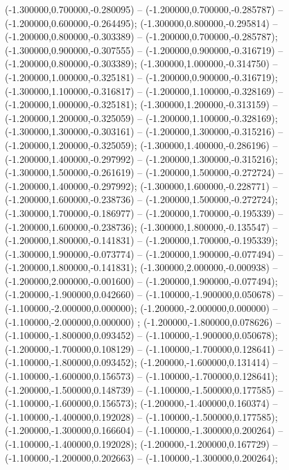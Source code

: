  (-1.300000,0.700000,-0.280095) -- (-1.200000,0.700000,-0.285787) -- (-1.200000,0.600000,-0.264495);
 (-1.300000,0.800000,-0.295814) -- (-1.200000,0.800000,-0.303389) -- (-1.200000,0.700000,-0.285787);
 (-1.300000,0.900000,-0.307555) -- (-1.200000,0.900000,-0.316719) -- (-1.200000,0.800000,-0.303389);
 (-1.300000,1.000000,-0.314750) -- (-1.200000,1.000000,-0.325181) -- (-1.200000,0.900000,-0.316719);
 (-1.300000,1.100000,-0.316817) -- (-1.200000,1.100000,-0.328169) -- (-1.200000,1.000000,-0.325181);
 (-1.300000,1.200000,-0.313159) -- (-1.200000,1.200000,-0.325059) -- (-1.200000,1.100000,-0.328169);
 (-1.300000,1.300000,-0.303161) -- (-1.200000,1.300000,-0.315216) -- (-1.200000,1.200000,-0.325059);
 (-1.300000,1.400000,-0.286196) -- (-1.200000,1.400000,-0.297992) -- (-1.200000,1.300000,-0.315216);
 (-1.300000,1.500000,-0.261619) -- (-1.200000,1.500000,-0.272724) -- (-1.200000,1.400000,-0.297992);
 (-1.300000,1.600000,-0.228771) -- (-1.200000,1.600000,-0.238736) -- (-1.200000,1.500000,-0.272724);
 (-1.300000,1.700000,-0.186977) -- (-1.200000,1.700000,-0.195339) -- (-1.200000,1.600000,-0.238736);
 (-1.300000,1.800000,-0.135547) -- (-1.200000,1.800000,-0.141831) -- (-1.200000,1.700000,-0.195339);
 (-1.300000,1.900000,-0.073774) -- (-1.200000,1.900000,-0.077494) -- (-1.200000,1.800000,-0.141831);
 (-1.300000,2.000000,-0.000938) -- (-1.200000,2.000000,-0.001600) -- (-1.200000,1.900000,-0.077494);
 (-1.200000,-1.900000,0.042660) -- (-1.100000,-1.900000,0.050678) -- (-1.100000,-2.000000,0.000000);
 (-1.200000,-2.000000,0.000000) -- (-1.100000,-2.000000,0.000000) ;
 (-1.200000,-1.800000,0.078626) -- (-1.100000,-1.800000,0.093452) -- (-1.100000,-1.900000,0.050678);
 (-1.200000,-1.700000,0.108129) -- (-1.100000,-1.700000,0.128641) -- (-1.100000,-1.800000,0.093452);
 (-1.200000,-1.600000,0.131414) -- (-1.100000,-1.600000,0.156573) -- (-1.100000,-1.700000,0.128641);
 (-1.200000,-1.500000,0.148739) -- (-1.100000,-1.500000,0.177585) -- (-1.100000,-1.600000,0.156573);
 (-1.200000,-1.400000,0.160374) -- (-1.100000,-1.400000,0.192028) -- (-1.100000,-1.500000,0.177585);
 (-1.200000,-1.300000,0.166604) -- (-1.100000,-1.300000,0.200264) -- (-1.100000,-1.400000,0.192028);
 (-1.200000,-1.200000,0.167729) -- (-1.100000,-1.200000,0.202663) -- (-1.100000,-1.300000,0.200264);
